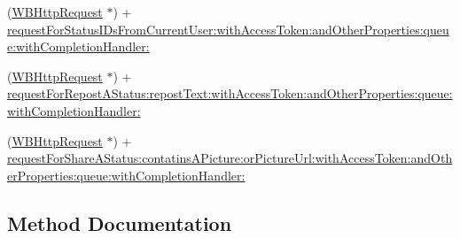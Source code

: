 \begin{DoxyCompactItemize}
\item 
(\mbox{\hyperlink{interface_w_b_http_request}{W\+B\+Http\+Request}} $\ast$) + \mbox{\hyperlink{category_w_b_http_request_07_weibo_share_08_ac75a0b99ef6dba004af29cd7c2498149}{request\+For\+Status\+I\+Ds\+From\+Current\+User\+:with\+Access\+Token\+:and\+Other\+Properties\+:queue\+:with\+Completion\+Handler\+:}}
\item 
(\mbox{\hyperlink{interface_w_b_http_request}{W\+B\+Http\+Request}} $\ast$) + \mbox{\hyperlink{category_w_b_http_request_07_weibo_share_08_ae32a41361851196fcf0ffc22b4354581}{request\+For\+Repost\+A\+Status\+:repost\+Text\+:with\+Access\+Token\+:and\+Other\+Properties\+:queue\+:with\+Completion\+Handler\+:}}
\item 
(\mbox{\hyperlink{interface_w_b_http_request}{W\+B\+Http\+Request}} $\ast$) + \mbox{\hyperlink{category_w_b_http_request_07_weibo_share_08_ad1a9992eb9534605e3b5d1100a2e693a}{request\+For\+Share\+A\+Status\+:contatins\+A\+Picture\+:or\+Picture\+Url\+:with\+Access\+Token\+:and\+Other\+Properties\+:queue\+:with\+Completion\+Handler\+:}}
\end{DoxyCompactItemize}


\subsection{Method Documentation}
\mbox{\label{category_w_b_http_request_07_weibo_share_08_ae32a41361851196fcf0ffc22b4354581}} 
